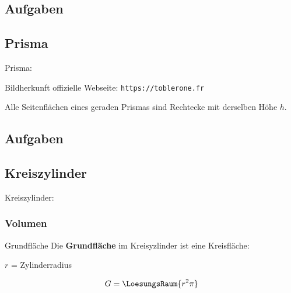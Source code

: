 \subsection*{Aufgaben}
\newpage



\subsection{Prisma}
Prisma: \\

\begin{center}Bildherkunft offizielle Webseite: \texttt{https://toblerone.fr}\end{center}


\begin{bemerkung}{}{}
  Alle Seitenflächen eines geraden Prismas sind Rechtecke mit derselben Höhe $h$.
  \end{bemerkung}

\subsection*{Aufgaben}

\newpage


\subsection{Kreiszylinder}

Kreiszylinder: 


\subsubsection{Volumen}

\begin{bemerkung}{Grundfläche}{}
  Die \textbf{Grundfläche} im Kreisyzlinder ist eine Kreisfläche:

  $r$ = Zylinderradius
  
  $$G = \LoesungsRaum{r^2\pi}$$
\end{bemerkung}

